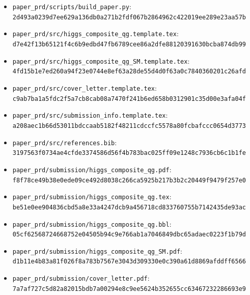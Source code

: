 \documentclass[
  10pt,
]{article}
\providecommand{\tightlist}{%
  \setlength{\itemsep}{0pt}\setlength{\parskip}{0pt}}
\begin{document}
\begin{itemize}
\tightlist
\item
  \texttt{paper\_prd/scripts/build\_paper.py}:\\
  \texttt{2d493a0239d7ee629a136db0a271b2fdf067b2864962c422019ee289e23aa57b}
\item
  \texttt{paper\_prd/src/higgs\_composite\_qg.template.tex}:\\
  \texttt{d7e42f13b65121f4c6b9edbd47fb6789cee86a2dfe88120391630bcba874db99}
\item
  \texttt{paper\_prd/src/higgs\_composite\_qg\_SM.template.tex}:\\
  \texttt{4fd15b1e7ed260a94f23e0744e8ef63a28de55d4d0f63a0c7840360201c26afd}
\item
  \texttt{paper\_prd/src/cover\_letter.template.tex}:\\
  \texttt{c9ab7ba1a5fdc2f5a7cb8cab08a7470f241b6ed658b0312901c35d00e3afa04f}
\item
  \texttt{paper\_prd/src/submission\_info.template.tex}:\\
  \texttt{a208aec1b66d53011bdccaab5182f48211cdccfc5578a80fcbafccc0654d3773}
\item
  \texttt{paper\_prd/src/references.bib}:\\
  \texttt{3197563f0734ae4cfde3374586d56f4b783bac025ff09e1248c7936cb6c1b1fe}
\item
  \texttt{paper\_prd/submission/higgs\_composite\_qg.pdf}:\\
  \texttt{f8f78ce49b38e0ede09ce492d8038c266ca5925b217b3b2c20449f9479f257e0}
\item
  \texttt{paper\_prd/submission/higgs\_composite\_qg.tex}:\\
  \texttt{be51e0ee904836cbd5a8e33a4247dcb9a456718cd833760755b7142435de93ac}
\item
  \texttt{paper\_prd/submission/higgs\_composite\_qg.bbl}:\\
  \texttt{05cf62568724668752e04505b94c9e766ab1a7046849dbc65adaec0223f1b79d}
\item
  \texttt{paper\_prd/submission/higgs\_composite\_qg\_SM.pdf}:\\
  \texttt{d1b11e4b83a81f026f8a783b7567e3043d309330e0c390a61d8869afddff6566}
\item
  \texttt{paper\_prd/submission/cover\_letter.pdf}:\\
  \texttt{7a7af727c5d82a82015bdb7a00294e8c9ee5624b352655cc63467232286693e9}
\end{itemize}
\end{document}
